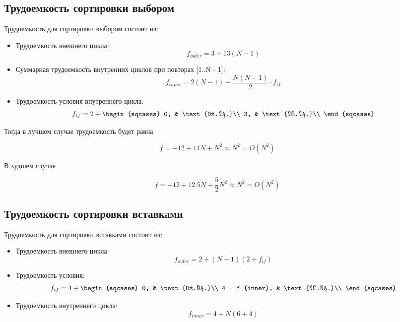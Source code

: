 \subsection{Трудоемкость сортировки выбором}

Трудоемкость для сортировки выбором состоит из:
\begin{itemize}
	\item Трудоемкость внешнего цикла:
	\begin{equation}
		f_{outer} = 3 + 13(N - 1)
	\end{equation}		
	\item Суммарная трудоемкость внутренних циклов при повторах [1..N - 1]:
	\begin{equation}
		f_{inner} = 2(N - 1) + \frac{N(N - 1)}{2} \cdot f_{if}
	\end{equation}
	\item Трудоемкость условия внутреннего цикла:
	\begin{equation}
		f_{if} = 2 + \begin{sqcases}
						0, & \text{л.с.}\\
						3, & \text{х.с.}\\
					 \end{sqcases}
	\end{equation}
\end{itemize}

Тогда в лучшем случае трудоемкость будет равна

\begin{equation}
	f = -12 + 14N + N^2 \approx N^2 = O(N^2)
\end{equation}

В худшем случае

\begin{equation}
	f = -12 + 12.5N + \frac{5}{2}N^2 \approx N^2 = O(N^2)
\end{equation}

\subsection{Трудоемкость сортировки вставками}

Трудоемкость для сортировки вставками состоит из:
\begin{itemize}
	\item Трудоемкость внешнего цикла:
	\begin{equation}
		f_{outer} = 2 + (N - 1)(2 + f_{if}) 
	\end{equation}
	\item Трудоемкость условия:
	\begin{equation}
		f_{if} = 4 + \begin{sqcases}
					 	0, & \text{л.с.}\\
					 	4 + f_{inner}, & \text{х.с.}\\
					 \end{sqcases}
	\end{equation}
	\item Трудоемкость внутреннего цикла:
	\begin{equation}
		f_{inner} = 4 + N(6 + 4)
	\end{equation}
\end{itemize}

